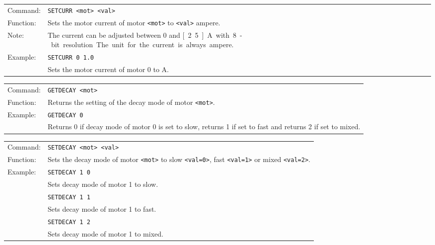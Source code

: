 \vspace{\vdistace}

\begin{table}[!htbp]
  \begin{tabularx}{\textwidth}{lX}
    Command:  & \texttt{SETCURR <mot> <val>}\\
    Function: & Sets the motor current of motor \texttt{<mot>} to \texttt{<val>} ampere.\\
    Note:     & The current can be adjusted between 0 and \unit[2.5]{A} with 8-bit resolution. The unit for the current is always ampere.\\
    Example:  & \texttt{SETCURR 0 1.0}\\
              & Sets the motor current of motor 0 to \unit[1]{A}.
  \end{tabularx}
\end{table}

\vspace{\vdistace}

\begin{table}[!htbp]
  \begin{tabularx}{\textwidth}{lX}
    Command:  & \texttt{GETDECAY <mot>}\\
    Function: & Returns the setting of the decay mode of motor \texttt{<mot>}.\\
    Example:  & \texttt{GETDECAY 0}\\
              & Returns 0 if decay mode of motor 0 is set to slow, returns 1 if set to fast and returns 2 if set to mixed.
  \end{tabularx}
\end{table}

\vspace{\vdistace}

\begin{table}[!htbp]
  \begin{tabularx}{\textwidth}{lX}
    Command:  & \texttt{SETDECAY <mot> <val>}\\
    Function: & Sets the decay mode of motor \texttt{<mot>} to slow \texttt{<val=0>}, fast \texttt{<val=1>} or mixed \texttt{<val=2>}.\\
    Example:  & \texttt{SETDECAY 1 0}\\
              & Sets decay mode of motor 1 to slow.\\
              & \texttt{SETDECAY 1 1}\\
              & Sets decay mode of motor 1 to fast.\\
              & \texttt{SETDECAY 1 2}\\
              & Sets decay mode of motor 1 to mixed.
  \end{tabularx}
\end{table}

